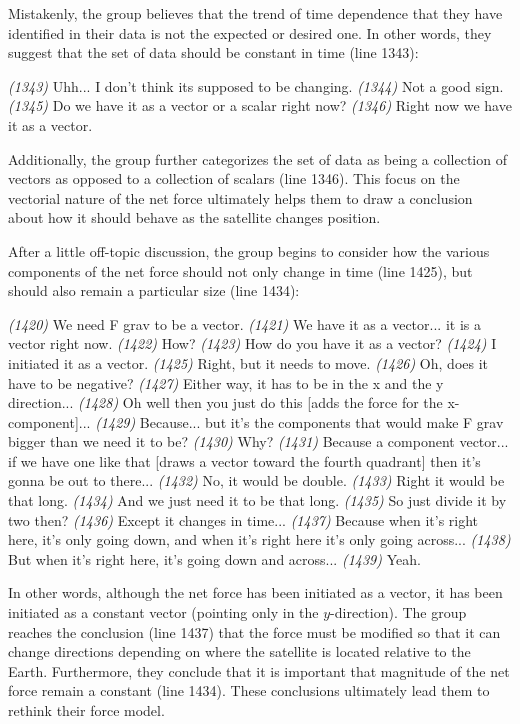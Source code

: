 \documentclass{msuphddissertation}
\begin{document}
\begin{doublespace}
Mistakenly, the group believes that the trend of time dependence that they have identified in their data is not the expected or desired one.  In other words, they suggest that the set of data should be constant in time (line 1343):  \begin{description}
\SB \textit{(1343)} Uhh... I don't think its supposed to be changing.
\SB \textit{(1344)} Not a good sign.
\SB \textit{(1345)} Do we have it as a vector or a scalar right now?
\SD \textit{(1346)} Right now we have it as a vector.
\end{description}  Additionally, the group further categorizes the set of data as being a collection of vectors as opposed to a collection of scalars (line 1346).  This focus on the vectorial nature of the net force ultimately helps them to draw a conclusion about how it should behave as the satellite changes position.

After a little off-topic discussion, the group begins to consider how the various components of the net force should not only change in time (line 1425), but should also remain a particular size (line 1434):  \begin{description}
\SB \textit{(1420)} We need F grav to be a vector.
\SD \textit{(1421)} We have it as a vector... it is a vector right now.
\SB \textit{(1422)} How?
\SA \textit{(1423)} How do you have it as a vector?
\SD \textit{(1424)} I initiated it as a vector.
\SB \textit{(1425)} Right, but it needs to move.
\SD \textit{(1426)} Oh, does it have to be negative?
\SB \textit{(1427)} Either way, it has to be in the x and the y direction...
\SD \textit{(1428)} Oh well then you just do this [adds the force for the x-component]...
\SB \textit{(1429)} Because... but it's the components that would make F grav bigger than we need it to be?
\SD \textit{(1430)} Why?
\SB \textit{(1431)} Because a component vector... if we have one like that [draws a vector toward the fourth quadrant] then it's gonna be out to there...
\SC \textit{(1432)} No, it would be double.
\SB \textit{(1433)} Right it would be that long.
\SB \textit{(1434)} And we just need it to be that long.
\SD \textit{(1435)} So just divide it by two then?
\SB \textit{(1436)} Except it changes {in time}...
\SB \textit{(1437)} Because when it's right here, it's only going down, and when it's right here it's only going across...
\SB \textit{(1438)} But when it's right here, it's going down and across...
\SC \textit{(1439)} Yeah.
\end{description}  In other words, although the net force has been initiated as a vector, it has been initiated as a constant vector (pointing only in the $y$-direction).  The group reaches the conclusion (line 1437) that the force must be modified so that it can change directions depending on where the satellite is located relative to the Earth.  Furthermore, they conclude that it is important that magnitude of the net force remain a constant (line 1434).  These conclusions ultimately lead them to rethink their force model.


\end{doublespace}
\end{document}
